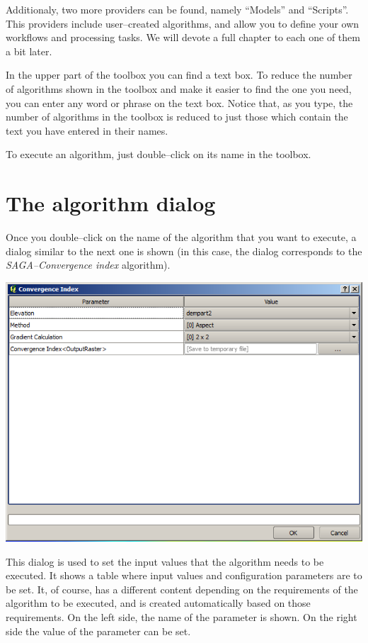 Additionaly, two more providers can be found, namely ``Models'' and ``Scripts''. This providers include user--created algorithms, and allow you to define your own workflows and processing tasks. We will devote a full chapter to each one of them a bit later.

In the upper part of the toolbox you can find a text box. To reduce the number of algorithms shown in the toolbox and make it easier to find the one you need, you can enter any word or phrase on the text box. Notice that, as you type, the number of algorithms in the toolbox is reduced to just those which contain the text you have entered in their names.

To execute an algorithm, just double--click on its name in the toolbox.

\section{The algorithm dialog}

Once you double--click on the name of the algorithm that you want to execute, a dialog similar to the next one is shown (in this case, the dialog corresponds to the \emph{SAGA--Convergence index} algorithm).

\begin{center}
\includegraphics[width=.8\columnwidth]{parameters_dialog.png}
\end{center}

This dialog is used to set the input values that the algorithm needs to be executed. It shows a table where input values and configuration parameters are to be set. It, of course, has a different content depending on the requirements of the algorithm to be executed, and is created automatically based on those requirements. On the left side, the name of the parameter is shown. On the right side the value of the parameter can be set.

